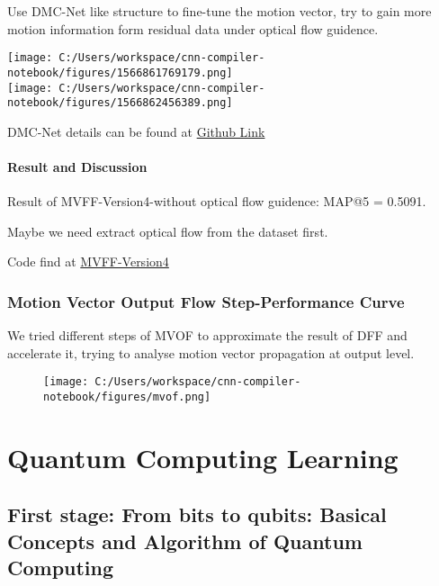 \documentclass[]{article}
\let\oldparagraph\paragraph
\renewcommand{\paragraph}[1]{\oldparagraph{#1}\mbox{}}
\begin{document}
Use DMC-Net like structure to fine-tune the motion vector, try to gain
more motion information form residual data under optical flow guidence.

\texttt{[image: C:/Users/workspace/cnn-compiler-notebook/figures/1566861769179.png]}\\
\texttt{[image: C:/Users/workspace/cnn-compiler-notebook/figures/1566862456389.png]}

DMC-Net details can be found at
\href{\%5Bhttps://github.com/OrdinaryCrazy/cnn-compiler-notebook/blob/master/Studying\%20Note/DMC-Net.md\%5D(https://github.com/OrdinaryCrazy/cnn-compiler-notebook/blob/master/Studying\%20Note/DMC-Net.md)}{Github
Link}

\hypertarget{header-n1900}{%
\paragraph{Result and Discussion}\label{header-n1900}}

Result of MVFF-Version4-without optical flow guidence: MAP@5 = 0.5091.

Maybe we need extract optical flow from the dataset first.

Code find at
\href{https://github.com/OrdinaryCrazy/mvff-sideversions/tree/master/Version4}{MVFF-Version4}

\hypertarget{header-n1904}{%
\subsubsection{Motion Vector Output Flow Step-Performance
Curve}\label{header-n1904}}

We tried different steps of MVOF to approximate the result of DFF and
accelerate it, trying to analyse motion vector propagation at output
level.

\begin{figure}
\centering
\texttt{[image: C:/Users/workspace/cnn-compiler-notebook/figures/mvof.png]}
\caption{}
\end{figure}

\hypertarget{header-n1907}{%
\section{Quantum Computing Learning}\label{header-n1907}}

\hypertarget{header-n1908}{%
\subsection{First stage: From bits to qubits: Basical Concepts and
Algorithm of Quantum Computing}\label{header-n1908}}
\end{document}
